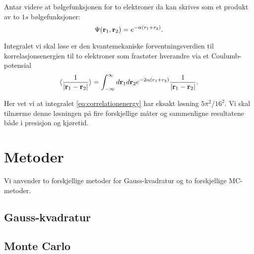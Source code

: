\documentclass[11pt]{article}
\begin{document}
Antar videre at bølgefunksjonen for to elektroner da kan skrives som et produkt av
to $1s$ bølgefunksjoner:
\[
   \Psi({\bf r}_1,{\bf r}_2)  =   e^{-\alpha (r_1+r_2)}.
\]

Integralet vi skal løse er den kvantemekaniske forventningsverdien
til korrelasjonsenergien til to elektroner som frastøter hverandre via et Coulumb-potensial
\begin{equation}\label{eq:correlationenergy}
   \langle \frac{1}{|{\bf r}_1-{\bf r}_2|} \rangle =
   \int_{-\infty}^{\infty} d{\bf r}_1d{\bf r}_2  e^{-2\alpha (r_1+r_2)}\frac{1}{|{\bf r}_1-{\bf r}_2|}.
\end{equation}

Her vet vi at integralet \eqref{eq:correlationenergy} har eksakt løsning $5\pi^2/16^2$. Vi skal tilnærme denne 
løsningen på fire forskjellige måter og sammenligne resultatene både i presisjon og kjøretid.

\section{Metoder}
Vi anvender to forskjellige metoder for Gauss-kvadratur og to forskjellige MC-metoder.
\subsection{Gauss-kvadratur}
\subsection{Monte Carlo}

\printbibliography
\end{document}
